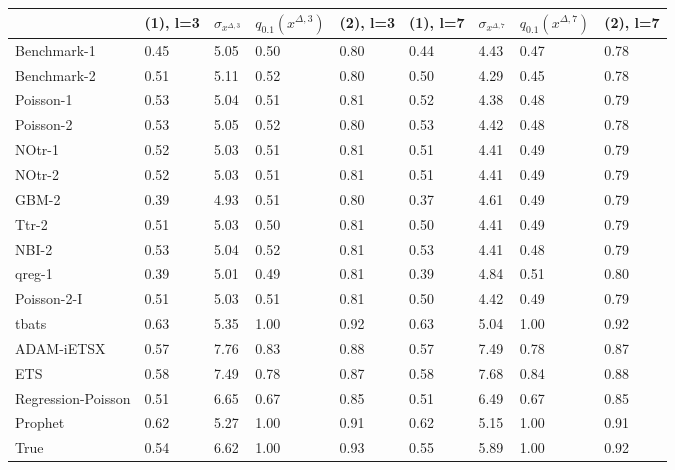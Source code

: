 \begin{tabular}{lllllllll}
\toprule
 & (1), l=3 & $\sigma_{x^{\Delta, 3}}$ & $q_{0.1} (x^{\Delta, 3})$ & (2), l=3 & (1), l=7 & $\sigma_{x^{\Delta, 7}}$ & $q_{0.1} (x^{\Delta, 7})$ & (2), l=7 \\
\midrule
Benchmark-1 & 0.45 & 5.05 & 0.50 & 0.80 & 0.44 & 4.43 & 0.47 & 0.78 \\
Benchmark-2 & 0.51 & 5.11 & 0.52 & 0.80 & 0.50 & 4.29 & 0.45 & 0.78 \\
Poisson-1 & 0.53 & 5.04 & 0.51 & 0.81 & 0.52 & 4.38 & 0.48 & 0.79 \\
Poisson-2 & 0.53 & 5.05 & 0.52 & 0.80 & 0.53 & 4.42 & 0.48 & 0.78 \\
NOtr-1 & 0.52 & 5.03 & 0.51 & 0.81 & 0.51 & 4.41 & 0.49 & 0.79 \\
NOtr-2 & 0.52 & 5.03 & 0.51 & 0.81 & 0.51 & 4.41 & 0.49 & 0.79 \\
GBM-2 & 0.39 & 4.93 & 0.51 & 0.80 & 0.37 & 4.61 & 0.49 & 0.79 \\
Ttr-2 & 0.51 & 5.03 & 0.50 & 0.81 & 0.50 & 4.41 & 0.49 & 0.79 \\
NBI-2 & 0.53 & 5.04 & 0.52 & 0.81 & 0.53 & 4.41 & 0.48 & 0.79 \\
qreg-1 & 0.39 & 5.01 & 0.49 & 0.81 & 0.39 & 4.84 & 0.51 & 0.80 \\
Poisson-2-I & 0.51 & 5.03 & 0.51 & 0.81 & 0.50 & 4.42 & 0.49 & 0.79 \\
tbats & 0.63 & 5.35 & 1.00 & 0.92 & 0.63 & 5.04 & 1.00 & 0.92 \\
ADAM-iETSX & 0.57 & 7.76 & 0.83 & 0.88 & 0.57 & 7.49 & 0.78 & 0.87 \\
ETS & 0.58 & 7.49 & 0.78 & 0.87 & 0.58 & 7.68 & 0.84 & 0.88 \\
Regression-Poisson & 0.51 & 6.65 & 0.67 & 0.85 & 0.51 & 6.49 & 0.67 & 0.85 \\
Prophet & 0.62 & 5.27 & 1.00 & 0.91 & 0.62 & 5.15 & 1.00 & 0.91 \\
True & 0.54 & 6.62 & 1.00 & 0.93 & 0.55 & 5.89 & 1.00 & 0.92 \\
\bottomrule
\end{tabular}
